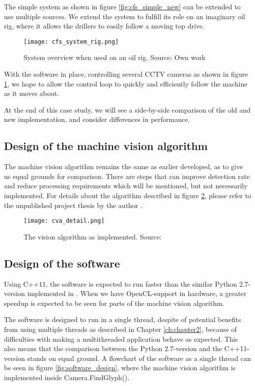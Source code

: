 The simple system as shown in figure \ref{fig:cfs_simple_new} can be extended to use multiple sources. We extend the system to fulfill its role on an imaginary oil rig, where it allows the drillers to easily follow a moving top drive.

\begin{figure}[ht]
    \centering
    \texttt{[image: cfs\_system\_rig.png]}
    \caption{System overview when used on an oil rig. Source: Own work}
    \label{fig:cfs_system_rig}
\end{figure}
\FloatBarrier

With the software in place, controlling several CCTV cameras as shown in figure \ref{fig:cfs_system_rig}, we hope to allow the control loop to quickly and efficiently follow the machine as it moves about. 

At the end of this case study, we will see a side-by-side comparison of the old and new implementation, and consider differences in performance.

\subsection{Design of the machine vision algorithm}
The machine vision algorithm remains the same as earlier developed, as to give us equal grounds for comparison. There are steps that can improve detection rate and reduce processing requirements which will be mentioned, but not necessarily implemented. For details about the algorithm described in figure \ref{fig:cva_detail}, please refer to the unpublished project thesis by the author \citep{joakimsk14}.

\begin{figure}[ht]
    \centering
    \texttt{[image: cva\_detail.png]}
    \caption{The vision algorithm as implemented. Source:\citet{joakimsk14}}
    \label{fig:cva_detail}
\end{figure}
\FloatBarrier

\subsection{Design of the software}
Using C++11, the software is expected to run faster than the similar Python 2.7-version implemented in \citet{joakimsk14}. When we have OpenCL-support in hardware, a greater speedup is expected to be seen for parts of the machine vision algorithm.

The software is designed to run in a single thread, despite of potential benefits from using multiple threads as described in Chapter \ref{ch:chapter2}, because of difficulties with making a multithreaded application behave as expected. This also means that the comparison between the Python 2.7-version and the C++11-version stands on equal ground. A flowchart of the software as a single thread can be seen in figure \ref{fig:software_design}, where the machine vision algorithm is implemented inside Camera.FindGlyph().

